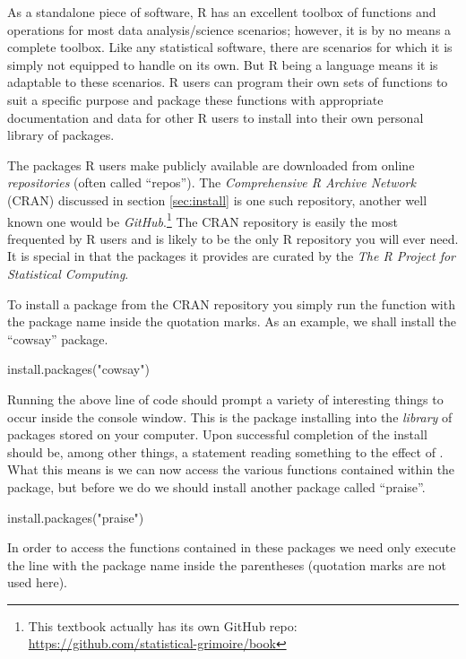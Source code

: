 As a standalone piece of software, R has an excellent toolbox of functions and operations for most data analysis/science scenarios; however, it is by no means a complete toolbox. Like any statistical software, there are scenarios for which it is simply not equipped to handle on its own.  But R being a language means it is adaptable to these scenarios.  R users can program their own sets of functions to suit a specific purpose and \gls{package} these functions with appropriate documentation and data for other R users to install into their own personal library of packages. 

The packages R users make publicly available are downloaded from online \textit{repositories} (often called ``repos'').  The \textit{Comprehensive R Archive Network} (CRAN) discussed in section \ref{sec:install} is one such repository, another well known one would be \textit{GitHub}.\footnote{This textbook actually has its own GitHub repo: \url{https://github.com/statistical-grimoire/book}}  The CRAN repository is easily the most frequented by R users and is likely to be the only R repository you will ever need. It is special in that the packages it provides are curated by the \textit{The R Project for Statistical Computing}.

To install a package from the CRAN repository you simply run the function  with the package name inside the quotation marks. As an example, we shall install the ``cowsay'' package.

\begin{inR}
install.packages("cowsay")
\end{inR}
\medskip

Running the above line of code should prompt a variety of interesting things to occur inside the console window. This is the package installing into the \textit{library} of packages stored on your computer. Upon successful completion of the install should be, among other things, a statement reading something to the effect of .  What this means is we can now access the various functions contained within the package, but before we do we should install another package called ``praise''.

\begin{inR}
install.packages("praise")
\end{inR}
\medskip

In order to access the functions contained in these packages we need only execute the line  with the package name inside the parentheses (quotation marks are not used here).

